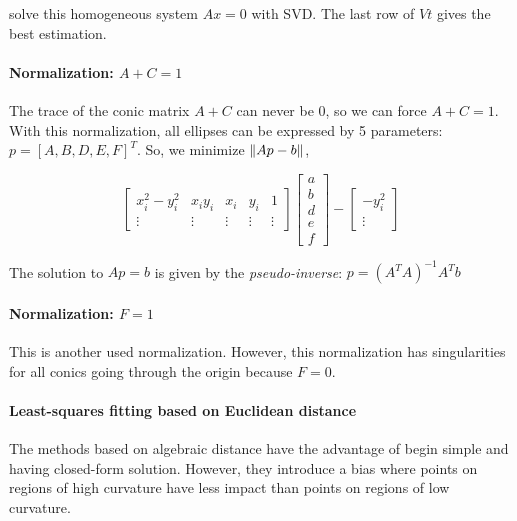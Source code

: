 solve this homogeneous system $Ax=0$ with SVD. The last row of $Vt$ gives the best estimation.

\paragraph{Normalization: $A + C = 1$}
The trace of the conic matrix $A + C$ can never be 0, so we can force $A + C = 1$.
With this normalization, all ellipses can be expressed by 5 parameters: $p = [A, B, D, E, F]^T$. So, we minimize $\left\lVert Ap-b\right\rVert$,

\begin{equation}
    \left[
    \begin{array}{ccccc}
    x_i^2 - y_i^2 & x_i y_i & x_i & y_i & 1  \\
    \vdots &\vdots &\vdots &\vdots &\vdots 
    \end{array}
    \right]
    \left[\begin{array}{c}
        a \\ b \\ d \\ e \\ f
    \end{array} \right]
     - 
    \left[\begin{array}{c}
        -y_i^2 \\
        \vdots
    \end{array} \right]
\end{equation}


The solution to $Ap=b$ is given by the \textit{pseudo-inverse}: $p = (A^T A)^{-1} A^T b$


\paragraph{Normalization: $F = 1$}
This is another used normalization. However, this normalization has singularities for all conics going through the origin because $F = 0$.


\paragraph{Least-squares fitting based on Euclidean distance}

The methods based on algebraic distance have the advantage of begin simple and having closed-form solution. However, they introduce a bias where points on regions of high curvature have less impact than points on regions of low curvature.

